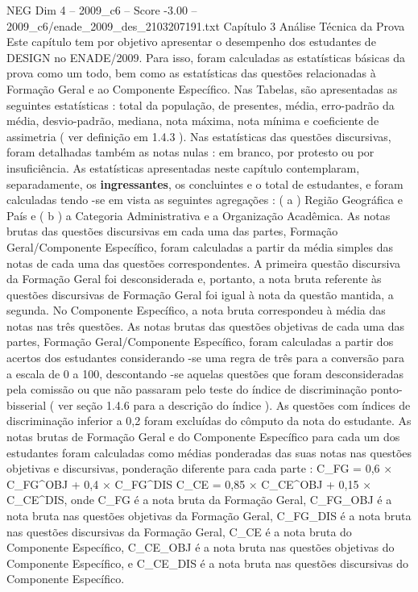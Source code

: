 \begin{textsample}{NEG Dim 4 – 2009\_c6 – Score -3.00 – 2009\_c6/enade\_2009\_des\_2103207191.txt}  \label{ex:f4_neg_036}
Capítulo 3 Análise Técnica da Prova Este capítulo tem por objetivo apresentar o desempenho dos estudantes de DESIGN no ENADE/2009.
Para isso, foram calculadas as estatísticas básicas da prova como um todo, bem como as estatísticas das questões relacionadas à Formação Geral e ao Componente Específico.
Nas Tabelas, são apresentadas as seguintes estatísticas : total da população, de presentes, média, erro-padrão da média, desvio-padrão, mediana, nota máxima, nota mínima e coeficiente de assimetria ( ver definição em 1.4.3 ).
Nas estatísticas das questões discursivas, foram detalhadas também as notas nulas : em branco, por protesto ou por insuficiência.
As estatísticas apresentadas neste capítulo contemplaram, separadamente, os \textbf{ingressantes}, os concluintes e o total de estudantes, e foram calculadas tendo -se em vista as seguintes agregações : ( a ) Região Geográfica e País e ( b ) a Categoria Administrativa e a Organização Acadêmica.
As notas brutas das questões discursivas em cada uma das partes, Formação Geral/Componente Específico, foram calculadas a partir da média simples das notas de cada uma das questões correspondentes.
A primeira questão discursiva da Formação Geral foi desconsiderada e, portanto, a nota bruta referente às questões discursivas de Formação Geral foi igual à nota da questão mantida, a segunda.
No Componente Específico, a nota bruta correspondeu à média das notas nas três questões.
As notas brutas das questões objetivas de cada uma das partes, Formação Geral/Componente Específico, foram calculadas a partir dos acertos dos estudantes considerando -se uma regra de três para a conversão para a escala de 0 a 100, descontando -se aquelas questões que foram desconsideradas pela comissão ou que não passaram pelo teste do índice de discriminação ponto-bisserial ( ver seção 1.4.6 para a descrição do índice ).
As questões com índices de discriminação inferior a 0,2 foram excluídas do cômputo da nota do estudante.
As notas brutas de Formação Geral e do Componente Específico para cada um dos estudantes foram calculadas como médias ponderadas das suas notas nas questões objetivas e discursivas, ponderação diferente para cada parte : C\_FG = 0,6 × C\_FG\textasciicircum{}OBJ + 0,4 × C\_FG\textasciicircum{}DIS C\_CE = 0,85 × C\_CE\textasciicircum{}OBJ + 0,15 × C\_CE\textasciicircum{}DIS, onde C\_FG é a nota bruta da Formação Geral, C\_FG\_OBJ é a nota bruta nas questões objetivas da Formação Geral, C\_FG\_DIS é a nota bruta nas questões discursivas da Formação Geral, C\_CE é a nota bruta do Componente Específico, C\_CE\_OBJ é a nota bruta nas questões objetivas do Componente Específico, e C\_CE\_DIS é a nota bruta nas questões discursivas do Componente Específico.

\end{textsample}
